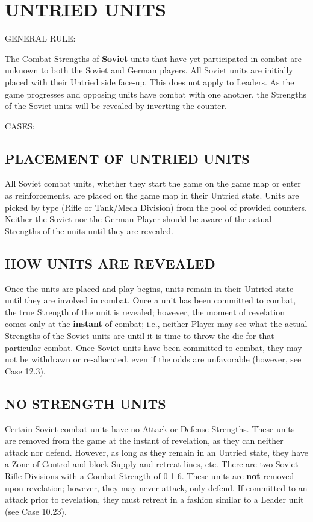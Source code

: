 \section{UNTRIED UNITS}

GENERAL RULE:

The Combat Strengths of \textbf{Soviet} units that have yet participated in combat are unknown to both the Soviet and German players. All Soviet units are initially placed with their Untried side face-up. This does not apply to Leaders. As the game progresses and opposing units have combat with one another, the Strengths of the Soviet units will be revealed by inverting the counter.

CASES:

\begin{flushleft}
  \subsection{PLACEMENT OF UNTRIED UNITS}
\end{flushleft}

All Soviet combat units, whether they start the game on the game map or enter as reinforcements, are placed on the game map in their Untried state. Units are picked by type (Rifle or Tank/Mech Division) from the pool of provided counters. Neither the Soviet nor the German Player should be aware of the actual Strengths of the units until they are revealed.

\subsection{HOW UNITS ARE REVEALED}

Once the units are placed and play begins, units remain in their Untried state until they are involved in combat. Once a unit has been committed to combat, the true Strength of the unit is revealed; however, the moment of revelation comes only at the \textbf{instant} of combat; i.e., neither Player may see what the actual Strengths of the Soviet units are until it is time to throw the die for that particular combat. Once Soviet units have been committed to combat, they may not be withdrawn or re-allocated, even if the odds are unfavorable (however, see Case 12.3).

\subsection{NO STRENGTH UNITS}

Certain Soviet combat units have no Attack or Defense Strengths. These units are removed from the game at the instant of revelation, as they can neither attack nor defend. However, as long as they remain in an Untried state, they have a Zone of Control and block Supply and retreat lines, etc. There are two Soviet Rifle Divisions with a Combat Strength of 0-1-6. These units are \textbf{not} removed upon revelation; however, they may never attack, only defend. If committed to an attack prior to revelation, they must retreat in a fashion similar to a Leader unit (see Case 10.23).

